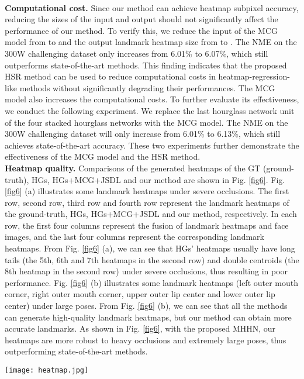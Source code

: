 \documentclass[journal]{IEEEtran}
\begin{document}
\\\indent\textbf{Computational cost.} Since our method can achieve heatmap subpixel accuracy, reducing the sizes of the input and output should not significantly affect the performance of our method. To verify this, we reduce the input of the MCG model from  to    and the output landmark heatmap size from  to . The NME on the 300W challenging dataset only increases from 6.01\% to 6.07\%, which still outperforms state-of-the-art methods. This finding indicates that the proposed HSR method can be used to reduce computational costs in heatmap-regression-like methods without significantly degrading their performances. The MCG model also increases the computational costs. To further evaluate its effectiveness, we conduct the following experiment. We replace the last hourglass network unit of the four stacked hourglass networks with the MCG model. The NME on the 300W challenging dataset will only increase from 6.01\% to 6.13\%, which still achieves state-of-the-art accuracy. These two experiments further demonstrate the effectiveness of the MCG model and the HSR method.
\\\indent\textbf{Heatmap quality.}  Comparisons of the generated heatmaps of the GT (ground-truth), HGs, HGs+MCG+JSDL and our method are shown in Fig. \ref{fig6}. Fig. \ref{fig6} (a) illustrates some landmark heatmaps under severe occlusions. The first row, second row, third row and fourth row represent the landmark heatmaps of the ground-truth, HGs, HGs+MCG+JSDL and our method, respectively. In each row, the first four columns represent the fusion of landmark heatmaps and face images, and the last four columns represent the corresponding landmark heatmaps. From Fig. \ref{fig6} (a), we can see that HGs' heatmaps usually have long tails (the 5th, 6th and 7th heatmaps in the second row) and double centroids (the 8th heatmap in the second row) under severe occlusions, thus resulting in poor performance. Fig. \ref{fig6} (b) illustrates some landmark heatmaps (left outer mouth corner, right outer mouth corner, upper outer lip center and lower outer lip center) under large poses. From Fig. \ref{fig6} (b), we can see that all the methods can generate high-quality landmark heatmaps, but our method can obtain more accurate landmarks. As shown in Fig. \ref{fig6}, with the proposed MHHN, our heatmaps are more robust to heavy occlusions and extremely large poses, thus outperforming state-of-the-art methods.
\begin{figure*}
	\begin{center}
\texttt{[image: heatmap.jpg]}
	\end{center}
	\caption{Comparisons of generated heatmaps of GT (ground-truth), HGs, HGs+MCG+JSDL and our method. With the proposed MHHN, we can find that our heatmaps are more robust to partial occlusions (a) and large poses (b).}
	\label{fig6}
\end{figure*}
\end{document}

